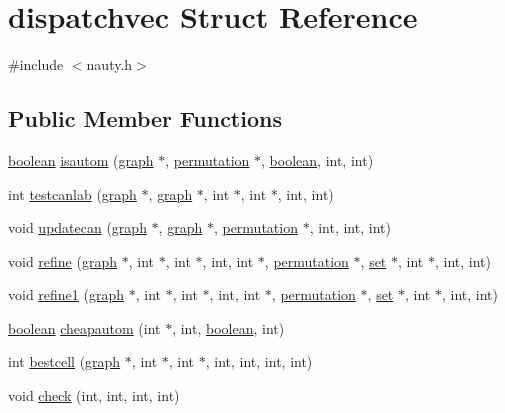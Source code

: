 \hypertarget{structdispatchvec}{}\section{dispatchvec Struct Reference}
\label{structdispatchvec}


{\ttfamily \#include $<$nauty.\+h$>$}

\subsection*{Public Member Functions}
\begin{DoxyCompactItemize}
\item 
\mbox{\hyperlink{nauty_8h_a621c38f1f10a1c565d897e3178b16d6e}{boolean}} \mbox{\hyperlink{structdispatchvec_a4437d6c12683af56ce0085c28d680324}{isautom}} (\mbox{\hyperlink{nauty_8h_a28c08db7c5948ab173e0f0497773f2f1}{graph}} $\ast$, \mbox{\hyperlink{classpermutation}{permutation}} $\ast$, \mbox{\hyperlink{nauty_8h_a621c38f1f10a1c565d897e3178b16d6e}{boolean}}, int, int)
\item 
int \mbox{\hyperlink{structdispatchvec_a3aafdf8d792c0dc2fdca1b8a1f88a695}{testcanlab}} (\mbox{\hyperlink{nauty_8h_a28c08db7c5948ab173e0f0497773f2f1}{graph}} $\ast$, \mbox{\hyperlink{nauty_8h_a28c08db7c5948ab173e0f0497773f2f1}{graph}} $\ast$, int $\ast$, int $\ast$, int, int)
\item 
void \mbox{\hyperlink{structdispatchvec_ad2dc76b9dced1aca091afd886a7e96c3}{updatecan}} (\mbox{\hyperlink{nauty_8h_a28c08db7c5948ab173e0f0497773f2f1}{graph}} $\ast$, \mbox{\hyperlink{nauty_8h_a28c08db7c5948ab173e0f0497773f2f1}{graph}} $\ast$, \mbox{\hyperlink{classpermutation}{permutation}} $\ast$, int, int, int)
\item 
void \mbox{\hyperlink{structdispatchvec_a0c9545ae6bc9b28c721ba846a1d03df9}{refine}} (\mbox{\hyperlink{nauty_8h_a28c08db7c5948ab173e0f0497773f2f1}{graph}} $\ast$, int $\ast$, int $\ast$, int, int $\ast$, \mbox{\hyperlink{classpermutation}{permutation}} $\ast$, \mbox{\hyperlink{nauty_8h_a9690bea211101f22a5e154087590c3da}{set}} $\ast$, int $\ast$, int, int)
\item 
void \mbox{\hyperlink{structdispatchvec_af60eaf2216aee19b11d7b1649fd38ac6}{refine1}} (\mbox{\hyperlink{nauty_8h_a28c08db7c5948ab173e0f0497773f2f1}{graph}} $\ast$, int $\ast$, int $\ast$, int, int $\ast$, \mbox{\hyperlink{classpermutation}{permutation}} $\ast$, \mbox{\hyperlink{nauty_8h_a9690bea211101f22a5e154087590c3da}{set}} $\ast$, int $\ast$, int, int)
\item 
\mbox{\hyperlink{nauty_8h_a621c38f1f10a1c565d897e3178b16d6e}{boolean}} \mbox{\hyperlink{structdispatchvec_adc5ae3eaf016e75aaf9fd241c4601f42}{cheapautom}} (int $\ast$, int, \mbox{\hyperlink{nauty_8h_a621c38f1f10a1c565d897e3178b16d6e}{boolean}}, int)
\item 
int \mbox{\hyperlink{structdispatchvec_a45a9bfbd9e3b9bba71f55448c8775cd5}{bestcell}} (\mbox{\hyperlink{nauty_8h_a28c08db7c5948ab173e0f0497773f2f1}{graph}} $\ast$, int $\ast$, int $\ast$, int, int, int, int)
\item 
void \mbox{\hyperlink{structdispatchvec_ab39aac88a709a5be3f294ad50c30991a}{check}} (int, int, int, int)
\end{DoxyCompactItemize}
